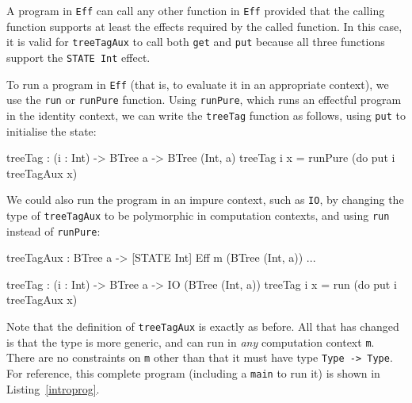 \noindent
A program in \texttt{Eff} can call any other function in \texttt{Eff} provided that the calling function supports at least the effects required by the called function.
In this case, it is valid for \texttt{treeTagAux} to call both \texttt{get} and \texttt{put} because all three functions support the \texttt{STATE Int} effect.

To run a program in \texttt{Eff} (that is, to evaluate it in an appropriate context), we use the \texttt{run} or \texttt{runPure} function.
Using \texttt{runPure}, which runs an effectful program in the identity context, we can write the \texttt{treeTag} function as follows, using \texttt{put} to initialise the state:

\begin{code}
treeTag : (i : Int) -> BTree a -> BTree (Int, a)
treeTag i x = runPure (do put i
                          treeTagAux x)
\end{code}

\noindent
We could also run the program in an impure context, such as \texttt{IO}, by changing the type of \texttt{treeTagAux} to be polymorphic in computation contexts, and using \texttt{run} instead of \texttt{runPure}:

\begin{code}
treeTagAux : BTree a -> { [STATE Int] } Eff m (BTree (Int, a))
...

treeTag : (i : Int) -> BTree a -> IO (BTree (Int, a))
treeTag i x = run (do put i
                      treeTagAux x)
\end{code}

\noindent
Note that the definition of \texttt{treeTagAux} is exactly as before.
All that has changed is that the type is more generic, and can run in \emph{any} computation context \texttt{m}.
There are no constraints on \texttt{m} other than that it must have type \texttt{Type -> Type}.
For reference, this complete program (including a \texttt{main} to run it) is shown in Listing~\ref{introprog}.


